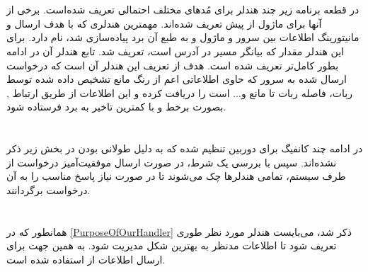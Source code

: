\section*{}
\begin{latin}
	
\end{latin}

در قطعه برنامه زیر چند هندلر برای مُد‌های مختلف احتمالی تعریف شده‌است. برخی از آنها برای ماژول
از پیش تعریف شده‌اند. مهمترین هندلری که با هدف ارسال و مانیتورینگ اطلاعات بین سرور و ماژول و به طبع آن برد
پیاده‌سازی شد،
نام دارد. برای این هندلر مقدار
که بیانگر مسیر
\noindent\unskip{}
در آدرس است،
تعریف شد. تابع هندلر آن در ادامه بطور کامل‌تر تعریف شده است.
هدف از تعریف این هندلر
\label{PurposeOfOurHandler}
آن است که درخواست ارسال شده به سرور که حاوی اطلاعاتی اعم از رنگ مانع تشخیص داده شده توسط ربات، فاصله ربات تا مانع و... است را دریافت کرده و این اطلاعات از طریق ارتباط
, بصورت برخط و با کمترین تاخیر به برد
فرستاده شود.



\section*{}
\begin{latin}
	
\end{latin}

در ادامه چند کانفیگ برای دوربین تنظیم شده که به دلیل طولانی بودن در بخش زیر ذکر نشده‌اند. سپس با بررسی یک شرط، در صورت ارسال موفقیت‌آمیز درخواست از طرف سیستم، تمامی هندلر‌ها چک می‌شوند تا در صورت نیاز پاسخ مناسب را به آن درخواست برگردانند.

\section*{}
\begin{latin}
	
\end{latin}

همانطور که در
\ref{PurposeOfOurHandler}
ذکر شد، می‌بایست هندلر مورد نظر طوری تعریف شود تا اطلاعات مدنظر به بهترین شکل مدیریت شود.
به همین جهت برای ارسال اطلاعات از
استفاده شده است.

